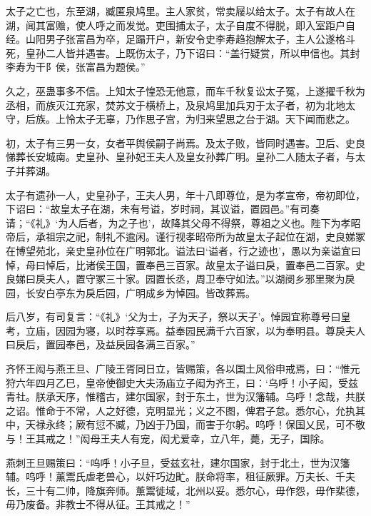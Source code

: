 \documentclass[12pt,UTF8]{ctexbook}
\begin{document}
太子之亡也，东至湖，臧匿泉鸠里。主人家贫，常卖屦以给太子。太子有故人在湖，闻其富赡，使人呼之而发觉。吏围捕太子，太子自度不得脱，即入室距户自经。山阳男子张富昌为卒，足蹋开户，新安令史李寿趋抱解太子，主人公遂格斗死，皇孙二人皆并遇害。上既伤太子，乃下诏曰：“盖行疑赏，所以申信也。其封李寿为干阝侯，张富昌为题侯。”



久之，巫蛊事多不信。上知太子惶恐无他意，而车千秋复讼太子冤，上遂擢千秋为丞相，而族灭江充家，焚苏文于横桥上，及泉鸠里加兵刃于太子者，初为北地太守，后族。上怜太子无辜，乃作思子宫，为归来望思之台于湖。天下闻而悲之。



初，太子有三男一女，女者平舆侯嗣子尚焉。及太子败，皆同时遇害。卫后、史良悌葬长安城南。史皇孙、皇孙妃王夫人及皇女孙葬广明。皇孙二人随太子者，与太子并葬湖。



太子有遗孙一人，史皇孙子，王夫人男，年十八即尊位，是为孝宣帝，帝初即位，下诏曰：“故皇太子在湖，未有号谥，岁时祠，其议谥，置园邑。”有司奏请；“《礼》‘为人后者，为之子也’，故降其父母不得祭，尊祖之义也。陛下为孝昭帝后，承祖宗之祀，制礼不逾闲。谨行视孝昭帝所为故皇太子起位在湖，史良娣冢在博望苑北，亲史皇孙位在广明郭北。谥法曰‘谥者，行之迹也’，愚以为亲谥宜曰悼，母曰悼后，比诸侯王国，置奉邑三百家。故皇太子谥曰戾，置奉邑二百家。史良娣曰戾夫人，置守冢三十家。园置长丞，周卫奉守如法。”以湖阌乡邪里聚为戾园，长安白亭东为戾后园，广明成乡为悼园。皆改葬焉。



后八岁，有司复言：“《礼》‘父为士，子为天子，祭以天子’。悼园宜称尊号曰皇考，立庙，因园为寝，以时荐享焉。益奉园民满千六百家，以为奉明县。尊戾夫人曰戾后，置园奉邑，及益戾园各满三百家。”



齐怀王闳与燕王旦、广陵王胥同日立，皆赐策，各以国土风俗申戒焉，曰：“惟元狩六年四月乙巳，皇帝使御史大夫汤庙立子闳为齐王，曰：‘乌呼！小子闳，受兹青社。朕承天序，惟稽古，建尔国家，封于东土，世为汉籓辅。乌呼！念哉，共朕之诏。惟命于不常，人之好德，克明显光；义之不图，俾君子怠。悉尔心，允执其中，天禄永终；厥有愆不臧，乃凶于乃国，而害于尔躬。呜呼！保国乂民，可不敬与！王其戒之！”闳母王夫人有宠，闳尤爱幸，立八年，薨，无子，国除。



燕刺王旦赐策曰：“呜呼！小子旦，受兹玄社，建尔国家，封于北土，世为汉籓辅。呜呼！薰鬻氏虐老兽心，以奸巧边甿。朕命将率，租征厥罪。万夫长、千夫长，三十有二帅，降旗奔师。薰鬻徙域，北州以妥。悉尔心，毋作怨，毋作棐德，毋乃废备。非教士不得从征。王其戒之！”
\end{document}
